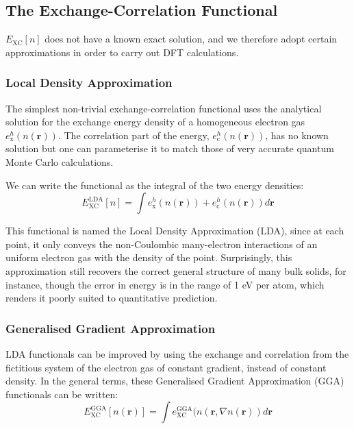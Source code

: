 \subsection{The Exchange-Correlation Functional}

$E_{\text{XC}}[n]$ does not have a known exact solution, and we therefore adopt certain approximations in order to carry out DFT calculations.

\subsubsection{Local Density Approximation}
The simplest non-trivial exchange-correlation functional uses the analytical solution for the exchange energy density of a homogeneous electron gas $e^h_{\text{x}}(n(\bm{r}))$. The correlation part of the energy, $e^h_{\text{c}}(n(\bm{r}))$, has no known solution but one can parameterise it to match those of very accurate quantum Monte Carlo calculations.\cite{Tanatar1989}

We can write the functional as the integral of the two energy densities:
\begin{equation}
    E^{\text{LDA}}_{\text{XC}}[n] = \int e^h_{\text{x}}(n(\bm{r})) + e^h_{\text{c}}(n(\bm{r})) d\bm{r}
\end{equation}

This functional is named the Local Density Approximation (LDA), since at each point, it only conveys the non-Coulombic many-electron interactions of an uniform electron gas with the density of the point. Surprisingly, this approximation still recovers the correct general structure of many bulk solids, for instance, though the error in energy is in the range of 1 eV per atom, which renders it poorly suited to quantitative prediction.\cite{Zhang2018}

\subsubsection{Generalised Gradient Approximation}
LDA functionals can be improved by using the exchange and correlation from the fictitious system of the electron gas of constant gradient, instead of constant density. In the general terms, these Generalised Gradient Approximation (GGA) functionals can be written:
\begin{equation}
    E^{\text{GGA}}_{\text{XC}}[n(\bm{r})] = \int e^{\text{GGA}}_{\text{XC}}(n(\bm{r},\nabla n(\bm{r})) d\bm{r}
\end{equation}

